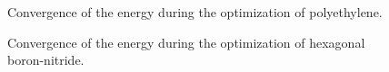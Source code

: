 \documentclass[prl,aps,preprint,superbib,12pt]{revtex4}
\begin{document}
\begin{figure}[h]
\caption{Convergence of the energy during the optimization
of polyethylene.}
\label{ch2-energ}
\end{figure}

\begin{figure}[h]
\caption{Convergence of the energy during the optimization
of hexagonal boron-nitride.}
\label{BN1x1-energ}
\end{figure}
\end{document}

